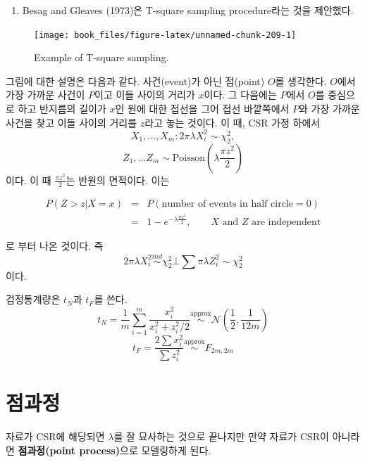 \documentclass[b5paper,]{book}
\providecommand{\tightlist}{%
  \setlength{\itemsep}{0pt}\setlength{\parskip}{0pt}}
\theoremstyle{definition}
\theoremstyle{definition}
\theoremstyle{definition}
\theoremstyle{remark}
\begin{document}
\begin{enumerate}
\def\labelenumi{\arabic{enumi}.}
\setcounter{enumi}{1}
\tightlist
\item
  Besag and Gleaves (1973)은 T-square sampling procedure라는 것을
  제안했다.
\end{enumerate}

\begin{figure}

{\centering \texttt{[image: book\_files/figure-latex/unnamed-chunk-209-1]} 

}

\caption{Example of T-square sampling.}\label{fig:unnamed-chunk-209}
\end{figure}

그림에 대한 설명은 다음과 같다. 사건(event)가 아닌 점(point) \(O\)를
생각한다. \(O\)에서 가장 가까운 사건이 \(P\)이고 이들 사이의 거리가
\(x\)이다. 그 다음에는 \(P\)에서 \(O\)를 중심으로 하고 반지름의 길이가
\(x\)인 원에 대한 접선을 그어 접선 바깥쪽에서 \(P\)와 가장 가까운 사건을
찾고 이들 사이의 거리를 \(z\)라고 놓는 것이다. 이 때, CSR 가정 하에서
\[X_{1}, \ldots, X_{m}: 2\pi\lambda X_{i}^{2} \sim \chi_{2}^{2},\]
\[Z_{1}, \ldots Z_{m} \sim \text{Poisson}(\lambda \frac{\pi z^{2}}{2})\]
이다. 이 때 \(\frac{\pi z^{2}}{2}\)는 반원의 면적이다. 이는

\begin{eqnarray*}
P(Z>z|X=x)&=& P(\text{number of events in half circle}=0)\\
&=& 1-e^{-\lambda \frac{\pi z^{2}}{2}}, \qquad{X \text{ and } Z \text{ are independent}}
\end{eqnarray*}

로 부터 나온 것이다. 즉
\[2\pi\lambda X_{i}^{2} \stackrel{ind}{\sim} \chi_{2}^{2} \bot \sum \pi\lambda Z_{i}^{2} \sim \chi_{2}^{2}\]
이다.

검정통계량은 \(t_{N}\)과 \(t_{F}\)를 쓴다.
\[t_{N}=\frac{1}{m}\sum_{i=1}^{m}\frac{x_{i}^{2}}{x_{i}^{2} + z_{i}^{2}/2} \stackrel{\text{approx}}{\sim}\mathcal{N}(\frac{1}{2}, \frac{1}{12m})\]
\[t_{F}=\frac{2\sum x_{i}^{2}}{\sum z_{i}^2} \stackrel{\text{approx}}{\sim} F_{2m,2m}\]

\chapter{점과정}\label{pointprocess}

자료가 CSR에 해당되면 \(\lambda\)를 잘 묘사하는 것으로 끝나지만 만약
자료가 CSR이 아니라면 \textbf{점과정(point process)}으로 모델링하게
된다.
\end{document}
